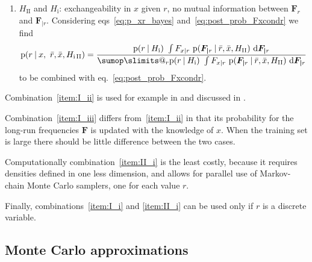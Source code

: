 \documentclass[\ifafour a4paper,12pt,\else a5paper,10pt,\fi%
onecolumn,oneside,article,%
british%
]{memoir}
\makeatletter
\theoremstyle{remark}
\theoremstyle{innote}
\def\sum{\DOTSI\sumop\slimits@}
\def\prod{\DOTSI\prodop\slimits@}
\newcommand*{\di}{\mathrm{d}}%
\newcommand*{\p}{\mathrm{p}}%
\renewcommand*{\|}[1][]{\nonscript\:#1\vert\nonscript\:\mathopen{}}
\renewcommand*{\=}{\TextOrMath\texteq\eq}
\newcommand*{\sect}{\S}%
\newcommand*{\eqn}{eq.}%
\newcommand*{\eqns}{eqs}%
\newcommand*{\q}{}%
\DeclareRobustCommand*{\q}{%
  \mathord{\mathpalette\bigcdot@{}}%
}
\newcommand*{\bigcdot@scalefactor}{0.7}
\newcommand*{\bigcdot@widthfactor}{1.5}
\newcommand*{\bigcdot@}[2]{%
  \sbox0{$#1\vcenter{}$}%
  \sbox2{$#1\cdot\m@th$}%
  \hbox to \bigcdot@widthfactor\wd2{%
    \hfil
    \raise\ht0\hbox{%
      \scalebox{\bigcdot@scalefactor}{%
        \lower\ht0\hbox{$#1\bullet\m@th$}%
      }%
    }%
    \hfil
  }%
}
\newcommand*{\ro}{r}
\newcommand*{\xo}{x}
\newcommand*{\rd}{\bar{r}}
\newcommand*{\xd}{\bar{x}}
\newcommand*{\yF}{\bm{F}}
\newcommand*{\yFr}{\yF_{\bm{\mid}r}}
\makeatother
\begin{document}
\begin{enumerate}[label=\arabic*.]
\item\label{item:II_i} $H_{\textrm{II}}$ and $H_{\textrm{i}}$:
  exchangeability in $x$ given $r$, no mutual information between
  $\yF_{r\q}$ and $\yFr$. Considering \eqns~\eqref{eq:p_xr_bayes}
  and~\eqref{eq:post_prob_Fxcondr} we find
  \begin{equation}
    \label{eq:post_xr_factorized}
    \p(\ro \| \xo,\ \rd,\xd, H_{\textrm{i\,II}}) = \frac{
    \p(\ro\|  H_{\textrm{i}})\ \int F_{\xo\mid\ro}\ \p(\yFr\| \rd,\xd,
    H_{\textrm{II}})\ \di\yFr
  }{
    \sum_{r}\p(r\|  H_{\textrm{i}})\ \int F_{\xo\mid r}\ \p(\yF_{\bm{\mid}r}\| \rd,\xd,
    H_{\textrm{II}})\ \di\yF_{\bm{\mid}r}
    }
\end{equation}
to be combined with \eqn~\eqref{eq:post_prob_Fxcondr}.
\end{enumerate}

Combination~\ref{item:I_ii} is used for example in
\textcite{muelleretal1996} and discussed in
\textcite[\sect~4]{quintanaetal2020}.

Combination~\ref{item:I_iii} differs from~\ref{item:I_ii} in that its
probability for the long-run frequencies $\yF$ is updated with the knowledge
of $x$. When the training set is large there should be little difference
between the two cases.

Computationally combination~\ref{item:II_i} is the least costly, because it
requires densities defined in one less dimension, and allows for parallel
use of Markov-chain Monte Carlo samplers, one for each value $r$.

Finally, combinations~\ref{item:I_i} and \ref{item:II_i} can be used only
if $r$ is a discrete variable.


\subsection{Monte Carlo approximations}
\label{sec:mc_approx}
\end{document}
